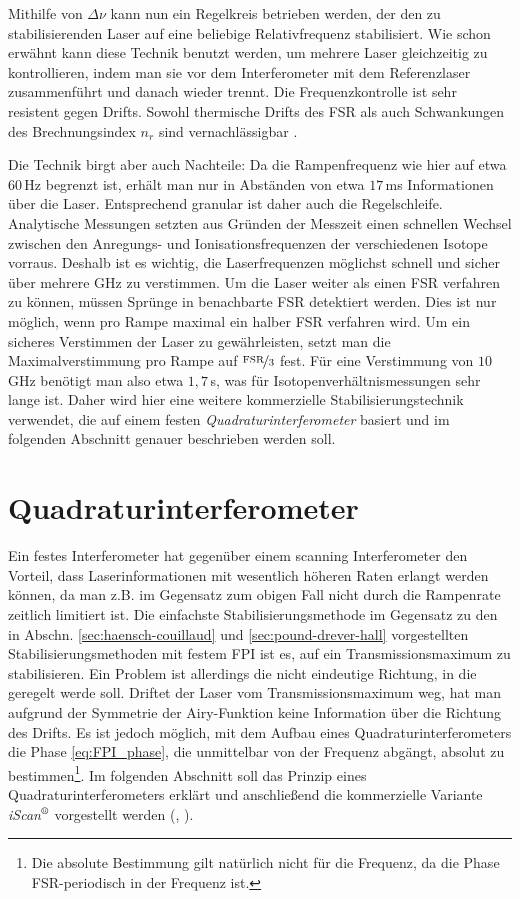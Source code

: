 Mithilfe von $\Delta\nu$ kann nun ein Regelkreis betrieben werden, der den zu
stabilisierenden Laser auf eine beliebige Relativfrequenz stabilisiert. Wie
schon erwähnt kann diese Technik benutzt werden, um mehrere Laser
gleichzeitig zu kontrollieren, indem man sie vor dem Interferometer mit dem
Referenzlaser zusammenführt und danach wieder trennt. Die Frequenzkontrolle
ist sehr resistent gegen Drifts. Sowohl thermische Drifts des FSR als auch
Schwankungen des Brechnungsindex $n_r$ sind vernachlässigbar
\cite{kuschnick:2000:diplomarbeit}.\par
Die Technik birgt aber auch Nachteile: Da die Rampenfrequenz wie hier auf etwa
$60\,$Hz begrenzt ist, erhält man nur in Abständen von etwa $17\,$ms
Informationen über die Laser. Entsprechend granular ist daher auch die
Regelschleife. Analytische Messungen setzten aus Gründen der Messzeit einen
schnellen Wechsel zwischen den Anregungs- und Ionisationsfrequenzen der verschiedenen
Isotope vorraus. Deshalb ist es wichtig, die Laserfrequenzen möglichst schnell
und sicher über mehrere GHz zu verstimmen. Um die Laser weiter als einen FSR
verfahren zu können, müssen Sprünge in benachbarte FSR detektiert werden. Dies ist nur möglich, wenn pro Rampe maximal ein halber FSR verfahren wird. Um ein sicheres
Verstimmen der Laser zu gewährleisten, setzt man die Maximalverstimmung pro
Rampe auf $\nicefrac{\text{FSR}}{3}$ fest. Für eine Verstimmung von $10\,$GHz benötigt
man also etwa $1,7\,$s, was für Isotopenverhältnismessungen sehr lange ist.
Daher wird hier eine weitere kommerzielle Stabilisierungstechnik verwendet, die auf einem festen
\textit{Quadraturinterferometer} basiert und im folgenden Abschnitt genauer
beschrieben werden soll.

\section{Quadraturinterferometer}\label{sec:quadraturinterferometer}
Ein festes Interferometer hat gegenüber einem scanning Interferometer den
Vorteil, dass Laserinformationen mit wesentlich höheren Raten erlangt werden
können, da man z.B. im Gegensatz zum obigen Fall nicht durch die Rampenrate
zeitlich limitiert ist. Die einfachste Stabilisierungsmethode im Gegensatz zu
den in Abschn. \ref{sec:haensch-couillaud} und \ref{sec:pound-drever-hall}
vorgestellten Stabilisierungsmethoden mit festem FPI ist es, auf ein Transmissionsmaximum zu
stabilisieren. Ein Problem ist allerdings die nicht eindeutige Richtung, in die
geregelt werde soll. Driftet der Laser vom Transmissionsmaximum weg, hat man
aufgrund der Symmetrie der Airy-Funktion keine Information über die Richtung
des Drifts. Es ist jedoch möglich, mit dem Aufbau eines
Quadraturinterferometers die Phase \eqref{eq:FPI_phase}, die unmittelbar von der Frequenz abgängt, absolut zu
bestimmen\footnote{Die absolute Bestimmung gilt natürlich nicht für die
Frequenz, da die Phase FSR-periodisch in der Frequenz ist.}. Im folgenden
Abschnitt soll das Prinzip eines Quadraturinterferometers erklärt und
anschließend die kommerzielle Variante
\textit{iScan$^\text{\textregistered}$} vorgestellt werden
(\cite{kinder:2003:dissertation}, \cite{iscan_hardware_guide}).


